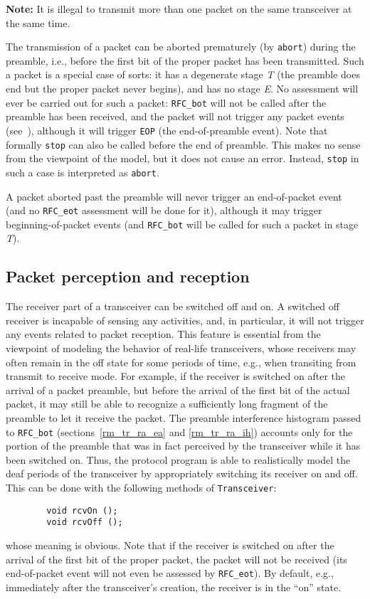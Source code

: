 \noindent
{\bf Note:}
It is illegal to transmit more than one packet on the same transceiver
at the same time.

The transmission of a packet can be aborted prematurely (by {\tt abort})
during the preamble, i.e., before the first bit of the proper packet has
been transmitted.
Such a packet is a special case of sorts: it has a degenerate stage
{\em T\/} (the preamble does end but
the proper packet never begins),
and has no stage {\em E}.
No assessment will ever be carried out
for such a packet: {\tt RFC\_bot} will not
be called after the preamble has been received, and the packet will not trigger
any packet events (see~), although it will trigger 
{\tt EOP} (the end-of-preamble event).
Note that formally {\tt stop} can also be called before the end of preamble.
This makes no sense from the viewpoint of the model, but it does not cause
an error.
Instead, {\tt stop} in such a case is interpreted as {\tt abort}.

A packet aborted past the preamble will never trigger 
an end-of-packet event (and no {\tt RFC\_eot} assessment will be done for
it), although it may trigger beginning-of-packet events (and {\tt RFC\_bot}
will be called for such a packet in stage {\em T\/}).

\subsection{Packet perception and reception}
\label{rm_tr_pp}

The receiver part of a transceiver can be switched off and on.
A switched off receiver is incapable of sensing any activities,
and, in particular, it will not trigger any events related to packet reception.
This feature is essential from the viewpoint of modeling the
behavior of real-life transceivers, whose receivers may often remain in
the off state for some periods of time, e.g., when transiting from transmit
to receive mode.
For example, if the receiver is switched on after the arrival of a packet
preamble, but before the arrival of the first bit of the actual packet,
it may still be able to recognize a sufficiently long fragment of the
preamble to let it receive the packet.
The preamble interference histogram passed to {\tt RFC\_bot}
(sections~\ref{rm_tr_ra_ea} and \ref{rm_tr_ra_ih}) accounts only for the
portion of the preamble that was in fact perceived by the transceiver
while it has been switched on.
Thus, the protocol program is able to realistically model the deaf
periods of the transceiver by appropriately switching its receiver on and
off.
This can be done with the following methods of {\tt Transceiver}:
\begin{verbatim}
        void rcvOn ();
        void rcvOff ();
\end{verbatim}
\noindent
whose meaning is obvious.
Note that if the receiver is switched on after the arrival of the first bit
of the proper packet, the packet will not be received (its end-of-packet
event will not even be assessed by {\tt RFC\_eot}).
By default, e.g., immediately after the transceiver's creation, the
receiver is in the ``on'' state.

